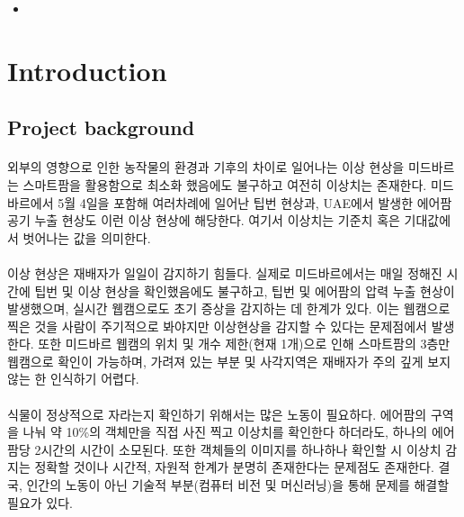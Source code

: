 \documentclass[11pt]{article}
\begin{document}
    \begin{itemize}[label={}]
    \item 
    \end{itemize}
    
    \pagebreak

    \tableofcontents
    \newpage
    
    \section{Introduction} 
    \subsection{Project background}
    \paragraph {} 외부의 영향으로 인한 농작물의 환경과 기후의 차이로 일어나는 이상 현상\citep{sharma2022technological}을 미드바르는 스마트팜을 활용함으로 최소화 했음에도 불구하고 여전히 이상치는 존재한다. 미드바르에서 5월 4일을 포함해 여러차례에 일어난 팁번 현상과, UAE에서 발생한 에어팜 공기 누출 현상도 이런 이상 현상에 해당한다. 여기서 이상치는 기준치 혹은 기대값에서 벗어나는 값을 의미한다. 

    \paragraph {}이상 현상은 재배자가 일일이 감지하기 힘들다. 실제로 미드바르에서는 매일 정해진 시간에 팁번 및 이상 현상을 확인했음에도 불구하고, 팁번 및 에어팜의 압력 누출 현상이 발생했으며, 실시간 웹캠으로도 초기 증상을 감지하는 데 한계가 있다. 이는 웹캠으로 찍은 것을 사람이 주기적으로 봐야지만 이상현상을 감지할 수 있다는 문제점에서 발생한다. 또한 미드바르 웹캠의 위치 및 개수 제한(현재 1개)으로 인해 스마트팜의 3층만 웹캠으로 확인이 가능하며, 가려져 있는 부분 및 사각지역은 재배자가 주의 깊게 보지 않는 한 인식하기 어렵다. 

    \paragraph {}식물이 정상적으로 자라는지 확인하기 위해서는 많은 노동이 필요하다. 에어팜의 구역을 나눠 약 10\%의 객체만을 직접 사진 찍고 이상치를 확인한다 하더라도, 하나의 에어팜당 2시간의 시간이 소모된다. 또한 객체들의 이미지를 하나하나 확인할 시 이상치 감지는 정확할 것이나 시간적, 자원적 한계가 분명히 존재한다는 문제점도 존재한다. 결국, 인간의 노동이 아닌 기술적 부분(컴퓨터 비전 및 머신러닝)을 통해 문제를 해결할 필요가 있다.   
\end{document}
